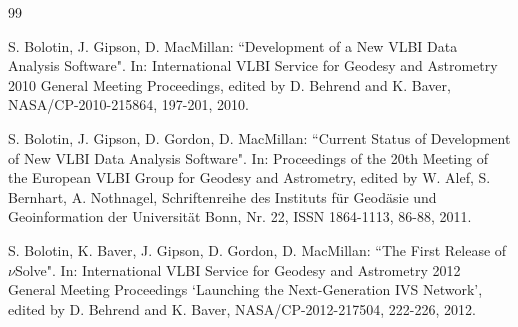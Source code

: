 \documentclass [10pt,letterpaper]{report}
\begin{document}


%
%
\begin{thebibliography}{99}

S. Bolotin, J. Gipson, D. MacMillan: ``Development of a New VLBI Data
Analysis Software". In: International VLBI Service for Geodesy and
Astrometry 2010 General Meeting Proceedings, edited by D. Behrend and K.
Baver, NASA/CP-2010-215864, 197-201, 2010.


S. Bolotin, J. Gipson, D. Gordon, D. MacMillan: ``Current Status of
Development of New VLBI Data Analysis Software". In: Proceedings of the
20th Meeting of the European VLBI Group for Geodesy and Astrometry,
edited by W. Alef, S. Bernhart, A. Nothnagel, Schriftenreihe des
Instituts f\"ur Geod\"asie und Geoinformation der Universit\"at Bonn,
Nr. 22, ISSN 1864-1113, 86-88, 2011.


S. Bolotin, K. Baver, J. Gipson, D. Gordon, D. MacMillan: ``The First
Release of $\nu$Solve". In: International VLBI Service for Geodesy and
Astrometry 2012 General Meeting Proceedings `Launching the
Next-Generation IVS Network', edited by D. Behrend and K. Baver,
NASA/CP-2012-217504, 222-226, 2012.


\end{thebibliography}
\end{document}
